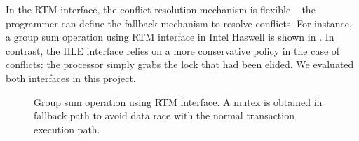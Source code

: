 In the RTM interface, the conflict resolution mechanism is flexible -- the
programmer can define the fallback mechanism to resolve conflicts. For instance,
a group sum operation using RTM interface in Intel Haswell is shown in
.  In contrast, the HLE interface relies on a more conservative
policy in the case of conflicts: the processor simply grabs the lock that had
been elided. We evaluated both interfaces in this project.

 \begin{figure}
    \parbox[t]{0.45\textwidth}{} \caption{Group
        sum operation using RTM interface. A mutex is obtained in fallback path
to avoid data race with the normal transaction execution path.} \label{fig:rtm}
\end{figure}
